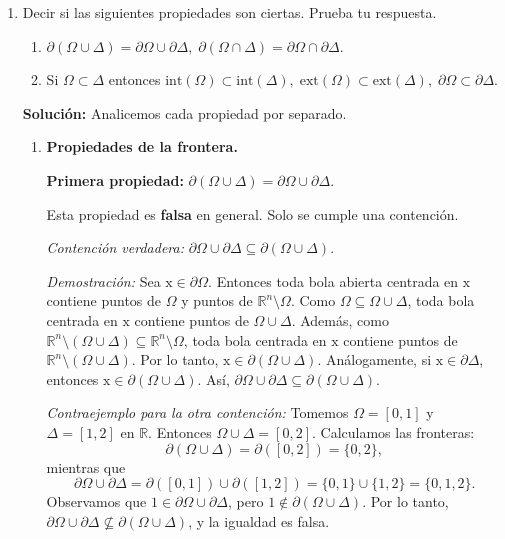 \documentclass[12pt]{article}
\newcommand{\Ext}{\mathrm{ext}}
\newcommand{\Int}{\mathrm{int}}
\newcommand{\R}{\mathbb R}
\newcommand{\x}{\mathrm x}
\begin{document}
\begin{enumerate}
\begin{enumerate}[(1)]
\textbf{Observación:} Usando las leyes de De Morgan, se puede demostrar que las propiedades correctas para el exterior son:
\[
\Ext(\Omega \cup \Delta) = \Ext(\Omega) \cap \Ext(\Delta),
\]
\[
\Ext(\Omega \cap \Delta) = \Ext(\Omega) \cup \Ext(\Delta).
\]
Es decir, el exterior intercambia uniones por intersecciones y viceversa, de manera análoga al complemento.
\end{enumerate}

\item Decir si las siguientes propiedades son ciertas. Prueba tu respuesta.
\begin{enumerate}[(1)]
\item $\partial(\Omega\cup \Delta) = \partial \Omega\cup \partial \Delta,\; 
\partial(\Omega\cap \Delta) = \partial \Omega\cap \partial \Delta$.
\item Si $\Omega\subset \Delta$ entonces $\Int(\Omega)\subset \Int(\Delta),\; \Ext(\Omega)\subset \Ext(\Delta),\; \partial \Omega\subset \partial \Delta$.
\end{enumerate}

\textbf{Solución: } Analicemos cada propiedad por separado.

\begin{enumerate}[(1)]
\item \textbf{Propiedades de la frontera.}

\textbf{Primera propiedad:} $\partial(\Omega\cup \Delta) = \partial \Omega\cup \partial \Delta$.

Esta propiedad es \textbf{falsa} en general. Solo se cumple una contención.

\textit{Contención verdadera:} $\partial \Omega \cup \partial \Delta \subseteq \partial(\Omega \cup \Delta)$.

\textit{Demostración:} Sea $\x \in \partial \Omega$. Entonces toda bola abierta centrada en $\x$ contiene puntos de $\Omega$ y puntos de $\R^n \setminus \Omega$. Como $\Omega \subseteq \Omega \cup \Delta$, toda bola centrada en $\x$ contiene puntos de $\Omega \cup \Delta$. Además, como $\R^n \setminus (\Omega \cup \Delta) \subseteq \R^n \setminus \Omega$, toda bola centrada en $\x$ contiene puntos de $\R^n \setminus (\Omega \cup \Delta)$. Por lo tanto, $\x \in \partial(\Omega \cup \Delta)$. Análogamente, si $\x \in \partial \Delta$, entonces $\x \in \partial(\Omega \cup \Delta)$. Así, $\partial \Omega \cup \partial \Delta \subseteq \partial(\Omega \cup \Delta)$.

\textit{Contraejemplo para la otra contención:} Tomemos $\Omega = [0,1]$ y $\Delta = [1,2]$ en $\R$. Entonces $\Omega \cup \Delta = [0,2]$. Calculamos las fronteras:
\[
\partial(\Omega \cup \Delta) = \partial([0,2]) = \{0, 2\},
\]
mientras que
\[
\partial \Omega \cup \partial \Delta = \partial([0,1]) \cup \partial([1,2]) = \{0, 1\} \cup \{1, 2\} = \{0, 1, 2\}.
\]
Observamos que $1 \in \partial \Omega \cup \partial \Delta$, pero $1 \notin \partial(\Omega \cup \Delta)$. Por lo tanto, $\partial \Omega \cup \partial \Delta \not\subseteq \partial(\Omega \cup \Delta)$, y la igualdad es falsa.


\end{enumerate}
\end{enumerate}
\end{document}
